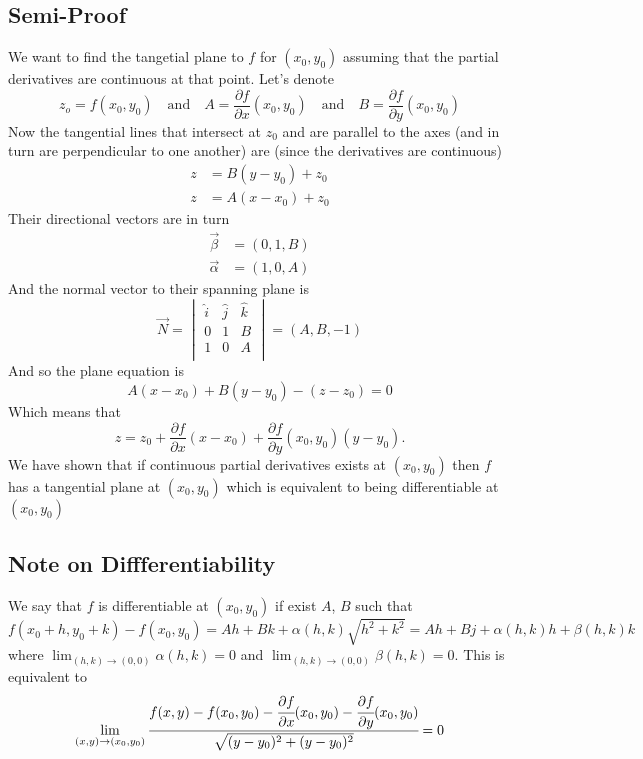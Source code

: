 \documentclass[11pt,a4paper]{article}
\theoremstyle{definition}
\theoremstyle{plain}
\begin{document}
	\subsection{Semi-Proof}
	We want to find the tangetial plane to $f$ for $(x_0,y_0)$ 
	assuming that the partial derivatives are continuous at that point. 
	Let's denote
	\[
		z_o=f(x_0,y_0)\quad\mathrm{and}\quad A = 
		\frac{\partial f}{\partial x}(x_0,y_0) \quad
		\mathrm{and} \quad B = \frac{\partial f}{\partial y}(x_0,y_0)
	\]
	Now the tangential lines that intersect at $z_0$ and are parallel 
	to the axes (and in turn are perpendicular to one another) 
	are (since the derivatives are continuous)
	\begin{align*} 
		z &=  B(y-y_0)+z_0 \\ 
		z &=  A(x-x_0)+z_0
	\end{align*}
	Their directional vectors are in turn
	\begin{align*} 
		\vec{\beta} &=  (0,1,B) \\ 
		\vec{\alpha} &=  (1,0,A)
	\end{align*}
	And the normal vector to their spanning plane is
	\[
	\vec{N} = \begin{vmatrix}
		\hat{i} & \hat{j} & \hat{k}\\
		0 & 1 & B\\
		1 & 0 & A\\
	\end{vmatrix}
	 = (A,B,-1)
	\]
	And so the plane equation is
  \[
		A(x-x_0) + B(y-y_0) - (z-z_0) = 0
  \]
  Which means that
  \[
		z =
    z_0 +
    \frac{\partial f}{\partial x}(x - x_0) +
    \frac{\partial f}{\partial y}(x_0,y_0)(y - y_0).
  \]
	We have shown that if continuous partial derivatives exists at $(x_0,y_0)$ 
	then $f$ has a tangential plane at $(x_0,y_0)$ which is equivalent to 
	being differentiable at $(x_0,y_0)$
	
	\subsection{Note on Diffferentiability}
	We say that $f$ is differentiable at $(x_0,y_0)$ if exist $A$, $B$ such that
	\[
		f(x_0+h,y_0+k)-f(x_0,y_0) 
		= Ah + Bk + \alpha(h,k)\sqrt{h^2+k^2}
		= Ah + Bj + \alpha(h,k)h + \beta(h,k)k
	\]
	where $\lim_{(h,k)\to(0,0)}{\alpha(h,k)}=0$ and 
  $\lim_{(h,k)\to (0,0)}{\beta(h,k)}=0$.
  This is equivalent to
	\[
		\lim_{(x,y)\to(x_0,y_0)}
    \cfrac{f(x,y) - f(x_0,y_0) - 
     \cfrac{\partial f}{\partial x}(x_0,y_0) - \cfrac{\partial f}
    {\partial y}(x_0,y_0)}{\sqrt{(y - y_0)^2 + (y - y_0)^2}} = 0
	\]
\end{document}
